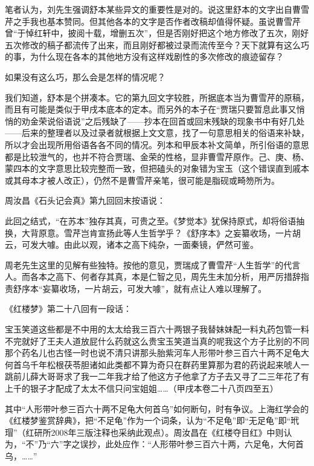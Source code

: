 笔者认为，刘先生强调舒本某些异文的重要性是对的。说这里舒本的文字出自曹雪芹之手我也基本赞同。但其他各本的文字是否作者改稿却值得怀疑。虽说曹雪芹曾“于悼红轩中，披阅十载，增删五次”，但是否刚好把这个地方修改了五次，刚好五次修改的稿子都流传了出来，而且刚好都被过录而流传至今？天下就算有这么巧的事，为什么现在各本的其他地方没有这样戏剧性的多次修改的痕迹留存？

如果没有这么巧，那么会是怎样的情况呢？

我们知道，舒本是个拼凑本。它的第九回文字较胜，所据底本当为曹雪芹的原稿，而且有可能是类似于甲戌本底本的定本。而另外的本子在“贾瑞只要暂息此事又悄悄的劝金荣说俗语说”之后残缺了------抄本在回首或回末残缺的现象书中有好几处------后来的整理者以及过录者就根据上文文意，找了一句意思相关的俗语来补缺，所以才会出现所用俗语各各不同的情况。列本和甲辰本补文简单，所引俗语的意思都是比较泄气的，也并不符合贾瑞、金荣的性格，显非曹雪芹原作。己、庚、杨、蒙四本的文字意思比较完整而一致，但把磕头的对象错为宝玉（这个错误直到戚本或其母本才被人改正），仍然不是曹雪芹亲笔，很可能是脂砚或畸笏所为。

周汝昌《石头记会真》第九回回末按语说：

此回之结式，“在苏本”独存其真，可贵之至。《梦觉本》犹保持原式，却将俗语抽换，大背原意。雪芹岂肯宣扬此等人生哲学乎？《舒序本》之妄纂收场，一片胡云，可发大噱。由此以观，诸本之高下纯杂，一面秦镜，俨然可鉴。

周老先生这里的见解有些独特。按他的意见，贾瑞成了曹雪芹“人生哲学”的代言人。而各本之高下、何者存其真，本是仁智之见，周先生未加分析，用严厉措辞指责舒序本“妄纂收场，一片胡云，可发大噱”，就有点让人难以理解了。

{}

《红楼梦》第二十八回有一段话：

宝玉笑道这些都是不中用的太太给我三百六十两银子我替妹妹配一料丸药包管一料不完就好了王夫人道放屁什么药就这么贵宝玉笑道当真的呢我这个方子比别的不同那个药名儿也古怪一时也说不清只讲那头胎紫河车人形带叶参三百六十两不足龟大何首乌千年松根茯苓胆诸如此类都不算为奇只在群药里算那为君的药说起来唬人一跳前儿薛大哥哥求了我一二年我才给了他这方子他拿了方子去又寻了二三年花了有上千的银子才配成了太太不信只问宝姐姐\ldots{}\ldots{}（甲戌本卷二十八页四至五）

其中“人形带叶参三百六十两不足龟大何首乌”如何断句，时有争议。上海红学会的《红楼梦鉴赏辞典》，把“不足龟”作为一个词条，认为“不足龟”即“无足龟”即“玳瑁”（红研所2008年三版注释也采纳此观点）。周汝昌在《红楼夺目红》中则认为，“不”乃“六”字之误抄，此处应作：“人形带叶参三百六十两，六足龟，大何首乌，\ldots{}\ldots{}”

